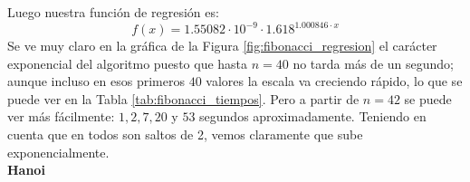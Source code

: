 \documentclass[12pt]{article}
\begin{document}
    Luego nuestra función de regresión es:
    \begin{equation*}
        f(x) = 1.55082\cdot 10^{-9}\cdot 1.618^{1.000846\cdot x}
    \end{equation*}
    Se ve muy claro en la gráfica de la Figura \ref{fig:fibonacci_regresion} el carácter exponencial del algoritmo puesto que hasta $n=40$ no tarda más de un segundo; aunque incluso en esos primeros $40$ valores la escala va creciendo rápido, lo que se puede ver en la Tabla \ref{tab:fibonacci_tiempos}. Pero a partir de $n=42$ se puede ver más fácilmente: $1, 2, 7, 20$ y $53$ segundos aproximadamente. Teniendo en cuenta que en todos son saltos de 2, vemos claramente que sube exponencialmente.\\

    \textbf{Hanoi}
    
\end{document}
